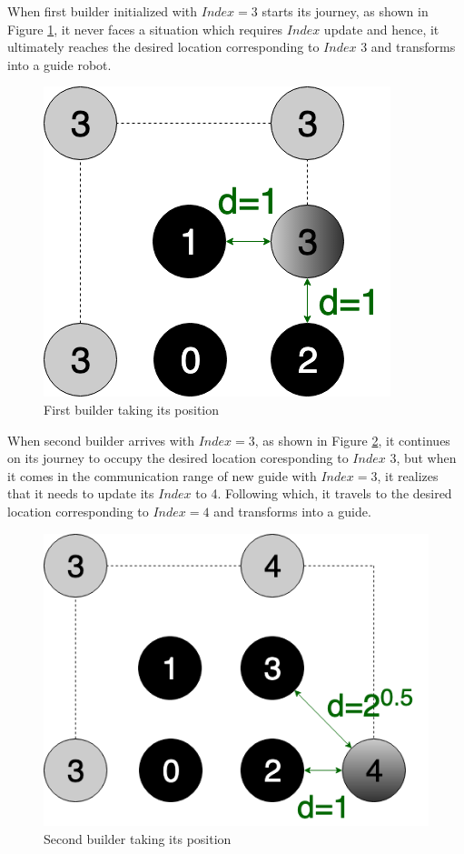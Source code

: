 \documentclass{report}[12pt]
\begin{document}
When first builder initialized with $Index=3$ starts its journey, as shown in Figure \ref{fig:shape_formation_process_1}, it never faces a situation which requires $Index$ update and hence, it ultimately reaches the desired location corresponding to $Index$ 3 and transforms into a guide robot. 
\begin{figure}[H]
    \centering
    \includegraphics[scale=0.4]{"images/shape_formation_process_1"}
    \caption{First builder taking its position}
    \label{fig:shape_formation_process_1}
\end{figure}
When second builder arrives with $Index=3$, as shown in Figure \ref{fig:shape_formation_process_2}, it continues on its journey to occupy the desired location coresponding to $Index$ 3, but when it comes in the communication range of new guide with $Index=3$, it realizes that it needs to update its $Index$ to 4. Following which, it travels to the desired location corresponding to $Index=4$ and transforms into a guide.
\begin{figure}[H]
    \centering
    \includegraphics[scale=0.4]{"images/shape_formation_process_2"}
    \caption{Second builder taking its position}
    \label{fig:shape_formation_process_2}
\end{figure}
\end{document}
